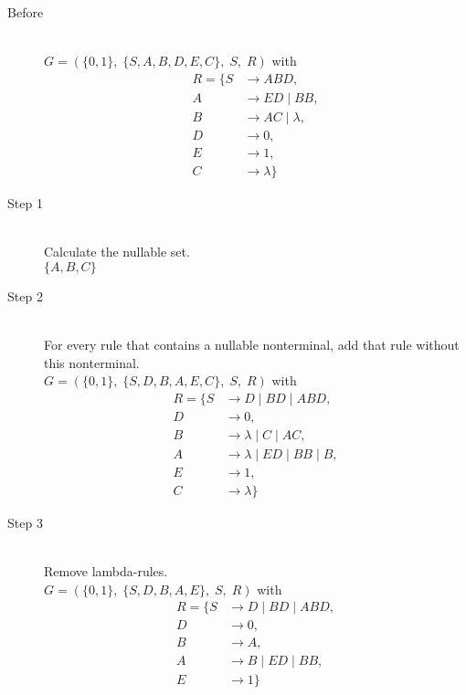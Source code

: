 \begin{description}
	\item[Before] \hfill \\ 
		$G=(\{	0, 1\},\;\{ S, A, B, D, E, C\},\;S,\;R)$ with
	\begin{align*}
		R=\{	S &\rightarrow ABD, \\ 
		A &\rightarrow ED\;|\;BB, \\ 
		B &\rightarrow AC\;|\;\lambda, \\ 
		D &\rightarrow 0, \\ 
		E &\rightarrow 1, \\ 
		C &\rightarrow \lambda\}
	\end{align*}
	\item[Step 1] \hfill \\ 
	Calculate the nullable set.\\ 
	$\{	A, 	B, 	C\}$
	\item[Step 2] \hfill \\ 
	For every rule that contains a nullable nonterminal, add that rule without this nonterminal.\\ 
	$G=(\{	0, 1\},\;\{ S, D, B, A, E, C\},\;S,\;R)$ with
	\begin{align*}
		R=\{	S &\rightarrow D\;|\;BD\;|\;ABD, \\ 
		D &\rightarrow 0, \\ 
		B &\rightarrow \lambda\;|\;C\;|\;AC, \\ 
		A &\rightarrow \lambda\;|\;ED\;|\;BB\;|\;B, \\ 
		E &\rightarrow 1, \\ 
		C &\rightarrow \lambda\}
	\end{align*}
	\item[Step 3] \hfill \\ 
	Remove lambda-rules.\\ 
	$G=(\{	0, 1\},\;\{ S, D, B, A, E\},\;S,\;R)$ with
	\begin{align*}
		R=\{	S &\rightarrow D\;|\;BD\;|\;ABD, \\ 
		D &\rightarrow 0, \\ 
		B &\rightarrow A, \\ 
		A &\rightarrow B\;|\;ED\;|\;BB, \\ 
		E &\rightarrow 1\}
	\end{align*}
\end{description}
